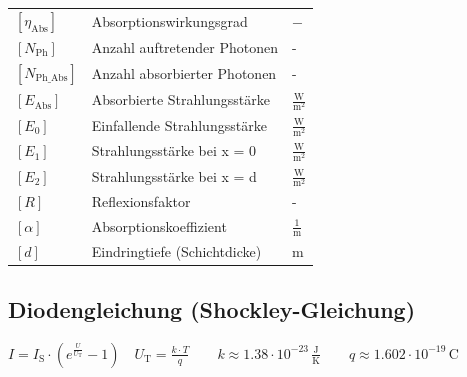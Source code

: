 \renewcommand{\arraystretch}{1.2}
\begin{tabular}{@{} l p{6.5cm} l @{}}
    $[\eta_{\mathrm{Abs}}]$   & Absorptionswirkungsgrad  \dotfill & $\mathrm{-}$ \\
    $[N_\mathrm{Ph}]$ & Anzahl auftretender Photonen \dotfill & - \\
    $[N_\mathrm{Ph\_Abs}]$ & Anzahl absorbierter Photonen \dotfill & - \\
    $[E_{\mathrm{Abs}}]$      & Absorbierte Strahlungsstärke  \dotfill & $\frac{\mathrm{W}}{\mathrm{m^2}}$\\
    $[E_{\mathrm{0}}]$      & Einfallende Strahlungsstärke  \dotfill & $\frac{\mathrm{W}}{\mathrm{m^2}}$\\
    $[E_{\mathrm{1}}]$      & Strahlungsstärke bei x = 0  \dotfill & $\frac{\mathrm{W}}{\mathrm{m^2}}$\\
    $[E_{\mathrm{2}}]$      & Strahlungsstärke bei x = d  \dotfill & $\frac{\mathrm{W}}{\mathrm{m^2}}$\\
    $[R]$         & Reflexionsfaktor \dotfill & - \\
    $[\alpha]$    & Absorptionskoeffizient \dotfill & $\frac{\mathrm{1}}{\mathrm{m}}$ \\
    $[d]$         & Eindringtiefe (Schichtdicke) \dotfill & $\mathrm{m}$ \\ 
\end{tabular}




\subsection{Diodengleichung (Shockley-Gleichung)}

$
\boxed{
I = I_\text{S} \cdot \left( e^{\frac{U}{U_\text{T}}} - 1 \right)
}
\quad
\boxed{
U_\text{T} = \frac{k \cdot T}{q}
}
\qquad 
k \approx 1.38 \cdot 10^{-23} \, \mathrm{\frac{J}{K}}
\qquad
q \approx 1.602 \cdot 10^{-19} \, \mathrm{C}
$

\vspace{0.1cm}

\renewcommand{\arraystretch}{1.2}
\begin{tabular}{@{} l p{6.5cm} l @{}}
    
    
\end{tabular}

